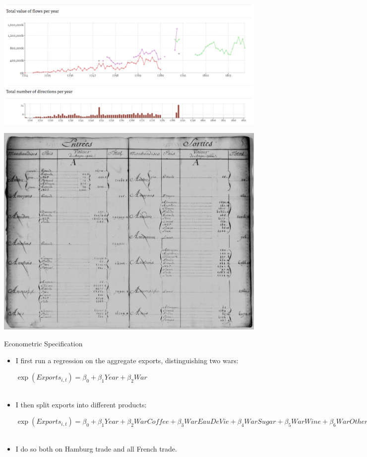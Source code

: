 \documentclass[11pt]{beamer}
\begin{document}
\begin{frame}
\includegraphics[scale=.3]{source2}
\end{frame}

\begin{frame}
\begin{center}
\includegraphics[scale=.25]{source3}
\end{center}

\end{frame}



\begin{frame}{Econometric Specification}
\begin{itemize}
\item{I first run a regression on the aggregate exports, distinguishing two wars:
\begin{center}
$\exp(Exports_{i,t})=\beta_0+\beta_1Year+\beta_2War$\\~\\
\end{center} }
\item{I then split exports into  different products:
\begin{center}
$\exp(Exports_{i,t})=\beta_0+\beta_1Year+\beta_2WarCoffee + \beta_3WarEauDeVie+\beta_4WarSugar +\beta_5WarWine +\beta_6WarOther$ \\~\\
\end{center}}
\item{I do so both on Hamburg trade and all French trade.}
\end{itemize}
\end{frame}
\end{document}
